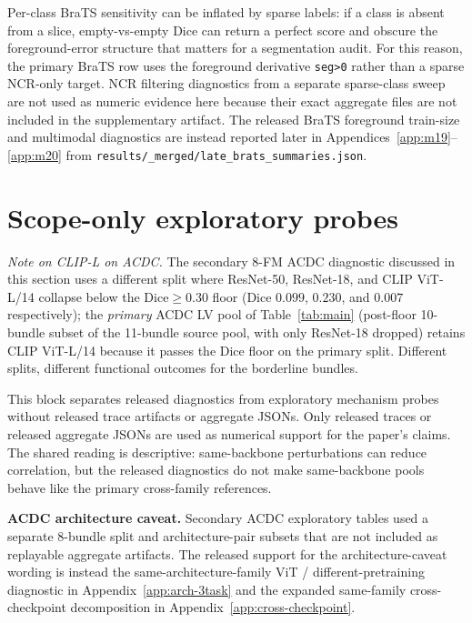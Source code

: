 Per-class BraTS sensitivity can be inflated by sparse labels: if a class is absent from a slice, empty-vs-empty Dice can return a perfect score and obscure the foreground-error structure that matters for a segmentation audit. For this reason, the primary BraTS row uses the foreground derivative \texttt{seg>0} rather than a sparse NCR-only target. NCR filtering diagnostics from a separate sparse-class sweep are not used as numeric evidence here because their exact aggregate files are not included in the supplementary artifact. The released BraTS foreground train-size and multimodal diagnostics are instead reported later in Appendices~\ref{app:m19}--\ref{app:m20} from \texttt{results/\_merged/late\_brats\_summaries.json}.

\section{Scope-only exploratory probes}
\label{sec:acdc-detail}
\label{sec:adaptation}
\label{app:hetlora}
\label{app:crossarch}

\emph{Note on CLIP-L on ACDC.} The secondary 8-FM ACDC diagnostic discussed in this section uses a different split where ResNet-50, ResNet-18, and CLIP ViT-L/14 collapse below the Dice${\geq}0.30$ floor (Dice $0.099$, $0.230$, and $0.007$ respectively); the \emph{primary} ACDC LV pool of Table~\ref{tab:main} (post-floor 10-bundle subset of the 11-bundle source pool, with only ResNet-18 dropped) retains CLIP ViT-L/14 because it passes the Dice floor on the primary split. Different splits, different functional outcomes for the borderline bundles.

This block separates released diagnostics from exploratory mechanism probes
without released trace artifacts or aggregate JSONs. Only released traces or
released aggregate JSONs are used as numerical support for the paper's claims.
The shared reading is descriptive: same-backbone perturbations can reduce
correlation, but the released diagnostics do not make same-backbone pools behave
like the primary cross-family references.

\textbf{ACDC architecture caveat.} Secondary ACDC exploratory tables used a
separate 8-bundle split and architecture-pair subsets that are not included as
replayable aggregate artifacts. The released support for the architecture-caveat
wording is instead the same-architecture-family ViT / different-pretraining
diagnostic in Appendix~\ref{app:arch-3task} and the expanded same-family
cross-checkpoint decomposition in Appendix~\ref{app:cross-checkpoint}.

